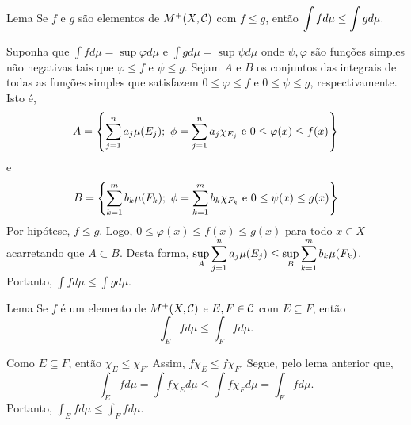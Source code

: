 \begin{env}{Lema}
	\label{lem:monoticiadade da integral de funções não negativas}
	Se $f$ e $g$ são elementos de $M^+(X,\operatorname{\mathcal{C}})$ com $f \leq g$, então 
	$ \displaystyle
	\displaystyle\int fd\mu \leq \int g d\mu.
	$
\end{env}
\begin{prova}
	Suponha que $\int f d\mu = \sup \varphi d\mu$ e $\int g d\mu = \sup \psi d\mu$ onde $\psi, \varphi$ são funções simples não negativas tais que
	$ \varphi \leq f$ e $\psi \leq g$.
	Sejam $A$ e $B$ os conjuntos das integrais de todas as funções simples que satisfazem $ 0\leq \varphi \leq f$ e $0\leq \psi \leq g$, respectivamente.
	Isto é, 
	$$
	A =\left\{
	\dsum_{j =1}^n a_j \mu(E_j); \ \phi = \dsum_{j =1}^n a_j\chi_{E_j}\ \textrm{e}\  0 \leq \varphi(x) \leq f(x)
	\right\}
	$$
	e
	$$
	B =\left\{
	\dsum_{k =1}^m b_k \mu(F_k); \ \phi = \dsum_{k =1}^m b_k\chi_{F_k}\ \textrm{e}\  0 \leq \psi(x) \leq g(x)
	\right\}
	$$
	Por hipótese, $ f\leq g$. 
	Logo, $0 \leq \varphi(x) \leq f(x) \leq g(x)$ para todo $x \in X$ acarretando que $A \subset B$.
	Desta forma, $\displaystyle\sup_A \displaystyle \sum_{j =1}^n a_j \mu(E_j) \leq \sup_B \displaystyle \sum_{k =1}^m b_k \mu(F_k)$.
	Portanto, $\displaystyle\int f d\mu \leq \int g d\mu$.
	
\end{prova}
\begin{env}{Lema}
	\label{lem:monoticiadade da integral com conjunto em funções não negativas}
	Se $f$ é um elemento de $M^+(X,\operatorname{\mathcal{C}})$ e $E,F \in \operatorname{\mathcal{C}}$ com $E \subseteq F$, então 
	$$
	\int_E fd\mu \leq \int_F f d\mu.
	$$
	\vspace{-0.2cm}
\end{env}
\begin{prova}
	Como $E \subseteq F$, então $\chi_E \leq \chi_F$.
	Assim, $f\chi_E \leq f\chi_F$.
	Segue, pelo lema anterior que, 
	$$
	\int_E f d\mu 
	=
	\int f\chi_E d\mu
	\leq 
	\int f\chi_F d\mu
	=
	\int_F f d\mu.
	$$
	Portanto, $ \displaystyle 
	\int_E f d\mu 
	\leq 
	\int_F f d\mu.
	$
\end{prova}


